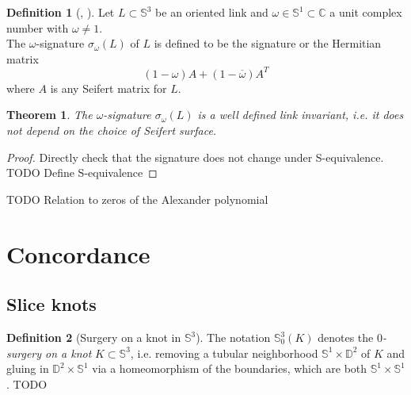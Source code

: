 \documentclass[nobib]{tufte-book} %
\newtheorem{theorem}{Theorem}
\theoremstyle{definition}
\newtheorem{definition}{Definition}
\theoremstyle{remark}
\newcommand{\sphere}[1]{\mathbb{S}^{#1}}
\newcommand{\disk}[1]{\mathbb{D}^{#1}}
\begin{document}
\begin{definition}[{\citep[Definition 8.8]{lickorish2012introduction},
	\citep[Definition 12.5]{kauffman1987knots}}]
	Let $L \subset \sphere{3}$ be an oriented link and
	$\omega \in \sphere{1} \subset \mathbb{C}$
	a unit complex number with $\omega \ne 1$. \\
	The $\omega$-signature $\sigma_{\omega}(L)$ of $L$
	is defined to be the signature or the Hermitian matrix
	\begin{equation*}
		(1 - \omega) A + (1 - \overline{\omega}) A^{T}
	\end{equation*}
	where $A$ is any Seifert matrix for $L$.
\end{definition}

\begin{theorem}
	The $\omega$-signature $\sigma_{\omega}(L)$ is a well defined link invariant,
	i.e. it does not depend on the choice of Seifert surface.
\end{theorem}

\begin{proof}
	Directly check that the signature does not change under S-equivalence.
	TODO Define S-equivalence
\end{proof}

TODO Relation to zeros of the Alexander polynomial

\section{Concordance}


\subsection{Slice knots}

\begin{definition}[Surgery on a knot in $\sphere{3}$]
	The notation $\sphere{3}_{0}(K)$ denotes the \textit{$0$-surgery on a knot}
	$K \subset \sphere{3}$, i.e. removing a tubular neighborhood
	$\sphere{1} \times \disk{2}$ of $K$ and gluing in $\disk{2} \times \sphere{1}$
	via a homeomorphism of the boundaries, which are both $\sphere{1} \times \sphere{1}$.
	TODO %
\end{definition}
\end{document}
